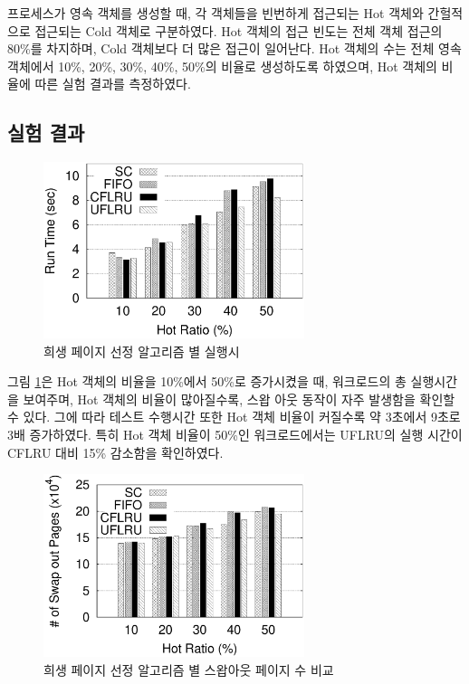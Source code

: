 \documentclass[letterpaper,twocolumn,10pt]{article}
\begin{document}
프로세스가 영속 객체를 생성할 때, 각 객체들을 빈번하게 접근되는 Hot 객체와 간헐적으로 접근되는 Cold 객체로 구분하였다. Hot 객체의 접근 빈도는 전체 객체 접근의 80\%를 차지하며, Cold 객체보다 더 많은 접근이 일어난다. Hot 객체의 수는 전체 영속 객체에서 10\%, 20\%, 30\%, 40\%, 50\%의 비율로 생성하도록 하였으며, Hot 객체의 비율에 따른 실험 결과를 측정하였다.

\subsection{실험 결과}

\begin{figure}[h]
\begin{center}
\includegraphics[width=3in]{./figure/exe_time.eps}
\caption{희생 페이지 선정 알고리즘 별 실행시}
\label{fig:exe_time}
\end{center}
\end{figure}

그림 \ref{fig:exe_time}은 Hot 객체의 비율을 10\%에서 50\%로 증가시켰을 때, 워크로드의 총 실행시간을 보여주며, Hot 객체의 비율이 많아질수록, 스왑 아웃 동작이 자주 발생함을 확인할 수 있다. 그에 따라 테스트 수행시간 또한 Hot 객체 비율이 커질수록 약 3초에서 9초로 3배 증가하였다. 특히 Hot 객체 비율이 50\%인 워크로드에서는 UFLRU의 실행 시간이 CFLRU 대비 15\% 감소함을 확인하였다.

\begin{figure}[h]
\begin{center}
\includegraphics[width=3in]{./figure/swap_count.eps}
\caption{희생 페이지 선정 알고리즘 별 스왑아웃 페이지 수 비교}
\label{fig:swap_count}
\end{center}
\end{figure}
\end{document}
